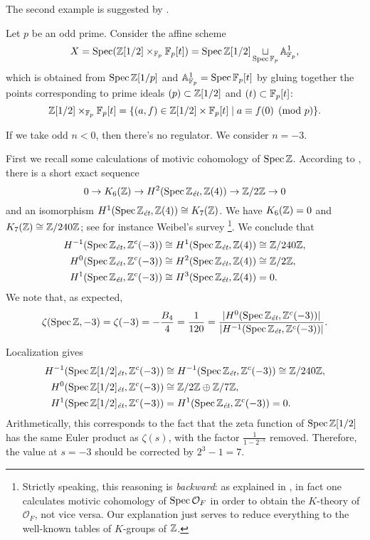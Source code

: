 \documentclass{article}
\numberwithin{equation}{section}
\begin{document}
The second example is suggested by \cite[\S 7]{Jordan-Poonen-2020}.

\begin{example}
  Let $p$ be an odd prime. Consider the affine scheme
  \[ X = \Spec (\ZZ [1/2] \times_{\FF_p} \FF_p [t]) =
    \Spec \ZZ [1/2] \mathop{\sqcup}_{\Spec \FF_p} \AA^1_{\FF_p}, \]
  which is obtained from $\Spec \ZZ [1/p]$ and $\AA^1_{\FF_p} = \Spec \FF_p [t]$ by
  gluing together the points corresponding to prime ideals
  $(p) \subset \ZZ [1/2]$ and $(t) \subset \FF_p [t]$:
  \[ \ZZ [1/2] \times_{\FF_p} \FF_p [t] =
    \{ (a,f) \in \ZZ [1/2] \times \FF_p [t] \mid a \equiv f (0) \pmod{p} \}. \]

  If we take odd $n < 0$, then there's no regulator. We consider $n = -3$.

  First we recall some calculations of motivic cohomology of $\Spec \ZZ$.
  According to \cite[Proposition~2.1]{Kolster-Sands-2008}, there is a short
  exact sequence
  $$0 \to K_6 (\ZZ) \to H^2 (\Spec \ZZ_\et, \ZZ (4)) \to \ZZ/2\ZZ \to 0$$
  and an isomorphism
  $H^1 (\Spec \ZZ_\et, \ZZ (4)) \cong K_7 (\ZZ)$.
  We have $K_6 (\ZZ) = 0$ and $K_7 (\ZZ) \cong \ZZ/240\ZZ$;
  see for instance Weibel's survey \cite{Weibel-2005}\footnote{Strictly
    speaking, this reasoning is \emph{backward}: as explained in
    \cite{Weibel-2005}, in fact one calculates motivic cohomology of
    $\Spec \mathcal{O}_F$ in order to obtain the $K$-theory of $\mathcal{O}_F$,
    not vice versa. Our explanation just serves to reduce everything to the
    well-known tables of $K$-groups of $\ZZ$.}.  We conclude that
  \begin{align*}
    H^{-1} (\Spec \ZZ_\et, \ZZ^c (-3)) & \cong H^1 (\Spec \ZZ_\et, \ZZ (4)) \cong \ZZ/240\ZZ, \\
    H^0 (\Spec \ZZ_\et, \ZZ^c (-3)) & \cong H^2 (\Spec \ZZ_\et, \ZZ (4)) \cong \ZZ/2\ZZ, \\
    H^1 (\Spec \ZZ_\et, \ZZ^c (-3)) & \cong H^3 (\Spec \ZZ_\et, \ZZ (4)) = 0.
  \end{align*}
  We note that, as expected,
  \[ \zeta (\Spec \ZZ, -3) = \zeta (-3) = -\frac{B_4}{4} = \frac{1}{120} =
    \frac{|H^0 (\Spec \ZZ_\et, \ZZ^c (-3))|}{|H^{-1} (\Spec \ZZ_\et, \ZZ^c (-3))|}. \]

  Localization gives
  \begin{align*}
    H^{-1} (\Spec \ZZ [1/2]_\et, \ZZ^c (-3)) & \cong H^{-1} (\Spec \ZZ_\et, \ZZ^c (-3)) \cong \ZZ/240\ZZ, \\
    H^0 (\Spec \ZZ [1/2]_\et, \ZZ^c (-3)) & \cong \ZZ/2\ZZ \oplus \ZZ/7\ZZ, \\
    H^1 (\Spec \ZZ [1/2]_\et, \ZZ^c (-3)) & = H^1 (\Spec \ZZ_\et, \ZZ^c (-3)) = 0.
  \end{align*}
  Arithmetically, this corresponds to the fact that the zeta function of
  $\Spec \ZZ [1/2]$ has the same Euler product as $\zeta (s)$, with the factor
  $\frac{1}{1-2^{-s}}$ removed. Therefore, the value at $s = -3$ should be
  corrected by $2^3 - 1 = 7$.


\end{example}
\end{document}

